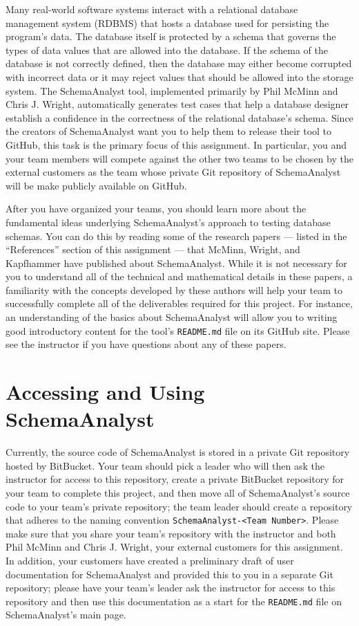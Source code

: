 Many real-world software systems interact with a relational database management system (RDBMS) that hosts a database
used for persisting the program's data. The database itself is protected by a schema that governs the types of data
values that are allowed into the database. If the schema of the database is not correctly defined, then the database may
either become corrupted with incorrect data or it may reject values that should be allowed into the storage system.
The SchemaAnalyst tool, implemented primarily by Phil McMinn and Chris J. Wright, automatically generates test cases
that help a database designer establish a confidence in the correctness of the relational database's schema. Since the
creators of SchemaAnalyst want you to help them to release their tool to GitHub, this task is the primary focus of this
assignment. In particular, you and your team members will compete against the other two teams to be chosen by the
external customers as the team whose private Git repository of SchemaAnalyst will be make publicly available on GitHub.

After you have organized your teams, you should learn more about the fundamental ideas underlying SchemaAnalyst's
approach to testing database schemas. You can do this by reading some of the research papers --- listed in the
``References'' section of this assignment --- that McMinn, Wright, and Kapfhammer have published about SchemaAnalyst.
While it is not necessary for you to understand all of the technical and mathematical details in these papers, a
familiarity with the concepts developed by these authors will help your team to successfully complete all of the
deliverables required for this project. For instance, an understanding of the basics about SchemaAnalyst will allow you
to writing good introductory content for the tool's {\tt README.md} file on its GitHub site. Please see the instructor
if you have questions about any of these papers.

\vspace*{-.05in}
\section*{Accessing and Using SchemaAnalyst}

Currently, the source code of SchemaAnalyst is stored in a private Git repository hosted by BitBucket. Your team should
pick a leader who will then ask the instructor for access to this repository, create a private BitBucket repository for
your team to complete this project, and then move all of SchemaAnalyst's source code to your team's private repository;
the team leader should create a repository that adheres to the naming convention {\tt SchemaAnalyst-<Team Number>}.
Please make sure that you share your team's repository with the instructor and both Phil McMinn and Chris J.  Wright,
your external customers for this assignment. In addition, your customers have created a preliminary draft of user
documentation for SchemaAnalyst and provided this to you in a separate Git repository; please have your team's leader
ask the instructor for access to this repository and then use this documentation as a start for the {\tt README.md} file
on SchemaAnalyst's main page.

